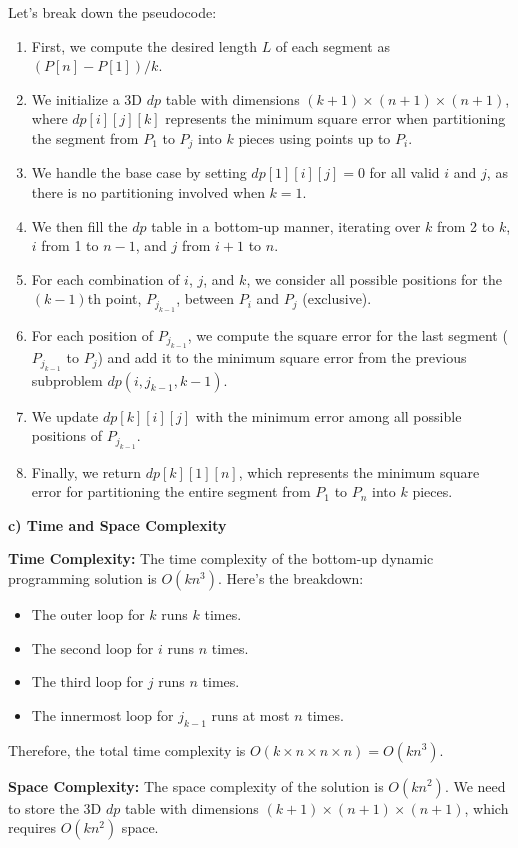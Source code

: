 \documentclass{article}
\begin{document}
Let's break down the pseudocode:
\begin{enumerate}
\item First, we compute the desired length $L$ of each segment as $(P[n] - P[1]) / k$.
\item We initialize a 3D $dp$ table with dimensions $(k + 1) \times (n + 1) \times (n + 1)$, where $dp[i][j][k]$ represents the minimum square error when partitioning the segment from $P_1$ to $P_j$ into $k$ pieces using points up to $P_i$.
\item We handle the base case by setting $dp[1][i][j] = 0$ for all valid $i$ and $j$, as there is no partitioning involved when $k = 1$.
\item We then fill the $dp$ table in a bottom-up manner, iterating over $k$ from 2 to $k$, $i$ from 1 to $n-1$, and $j$ from $i+1$ to $n$.
\item For each combination of $i$, $j$, and $k$, we consider all possible positions for the $(k-1)$th point, $P_{j_{k-1}}$, between $P_i$ and $P_j$ (exclusive).
\item For each position of $P_{j_{k-1}}$, we compute the square error for the last segment ($P_{j_{k-1}}$ to $P_j$) and add it to the minimum square error from the previous subproblem $dp(i, j_{k-1}, k-1)$.
\item We update $dp[k][i][j]$ with the minimum error among all possible positions of $P_{j_{k-1}}$.
\item Finally, we return $dp[k][1][n]$, which represents the minimum square error for partitioning the entire segment from $P_1$ to $P_n$ into $k$ pieces.
\end{enumerate}

\textbf{c) Time and Space Complexity}

\textbf{Time Complexity:}
The time complexity of the bottom-up dynamic programming solution is $O(kn^3)$. Here's the breakdown:
\begin{itemize}
\item The outer loop for $k$ runs $k$ times.
\item The second loop for $i$ runs $n$ times.
\item The third loop for $j$ runs $n$ times.
\item The innermost loop for $j_{k-1}$ runs at most $n$ times.
\end{itemize}
Therefore, the total time complexity is $O(k \times n \times n \times n) = O(kn^3)$.

\textbf{Space Complexity:}
The space complexity of the solution is $O(kn^2)$. We need to store the 3D $dp$ table with dimensions $(k + 1) \times (n + 1) \times (n + 1)$, which requires $O(kn^2)$ space.
\end{document}
